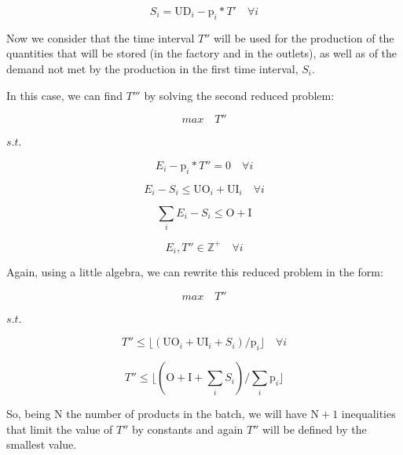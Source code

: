 \documentclass[authoryear,preprint,12pt]{elsarticle}
\begin{document}
\begin{equation}
\label{eq:unmet1}
S_i = \textrm{UD}_i - \textrm{p}_i * T' \quad \forall i
\end{equation}

Now we consider that the time interval $T''$ will be used for the production of the quantities that will be stored (in the factory and in the outlets), as well as of the demand not met by the production in the first time interval, $S_i$. 

In this case, we can find $T'''$ by solving the second reduced problem:

\begin{equation}
max \quad T''
\end{equation}

$s.t.$

\begin{equation}
E_i - \textrm{p}_i * T''  = 0 \quad \forall i
\end{equation}

\begin{equation}
E_i - S_i \leq \textrm{UO}_i + \textrm{UI}_i \quad \forall i
\end{equation}

\begin{equation}
\sum_i {E_i - S_i} \leq \textrm{O} + \textrm{I}
\end{equation}

\begin{equation}
E_i, T'' \in  \mathbb{Z}^+ \quad \forall i
\end{equation}

Again, using a little algebra, we can rewrite this reduced problem in the form:

\begin{equation}
max \quad T''
\end{equation}

$s.t.$

\begin{equation}
T'' \leq \lfloor{(\textrm{UO}_i + \textrm{UI}_i + S_i) / \textrm{p}_i}\rfloor  \quad \forall i
\end{equation}

\begin{equation}
T'' \leq \lfloor{(\textrm{O} + \textrm{I} + \sum_i {S_i}) / \sum_i {\textrm{p}_i}}\rfloor
\end{equation}

So, being $\textrm{N}$ the number of products in the batch, we will have $\textrm{N}+1$ inequalities that limit the value of $T''$ by constants and again $T''$ will be defined by the smallest value. \\
\end{document}
